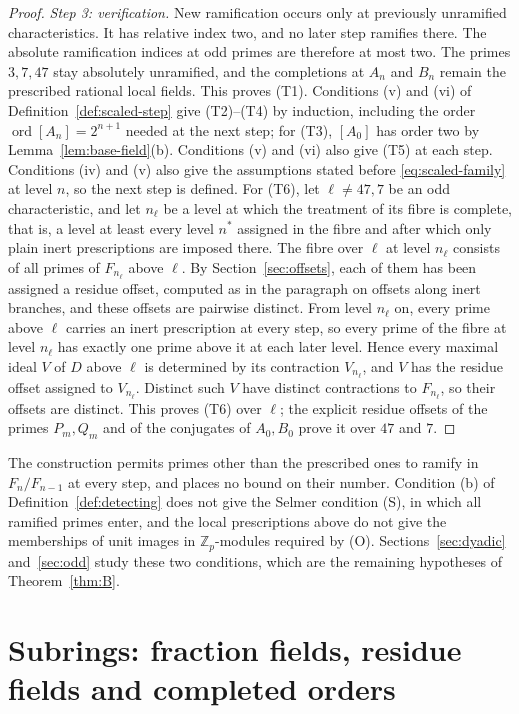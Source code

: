 \documentclass[11pt]{article}
\theoremstyle{plain}
\theoremstyle{definition}
\theoremstyle{remark}
\DeclareMathOperator{\ord}{ord}
\newcommand{\Z}{\mathbb Z}
\begin{document}
\begin{proof}
\emph{Step 3: verification.}  New ramification occurs only at previously
unramified characteristics.  It has relative index two, and no later step
ramifies there.  The absolute ramification indices at odd primes are
therefore at most two.  The primes $3,7,47$ stay absolutely unramified,
and the completions at $A_n$ and $B_n$ remain the prescribed rational
local fields.  This proves (T1).  Conditions (v) and (vi) of
Definition~\ref{def:scaled-step} give (T2)--(T4) by induction,
including the order $\ord[A_n]=2^{n+1}$ needed at the next step; for
(T3), $[A_0]$ has order two by Lemma~\ref{lem:base-field}(b).  Conditions (v)
and (vi) also give (T5) at each step.  Conditions (iv) and (v) also give the assumptions
stated before \eqref{eq:scaled-family} at level $n$, so the next step is
defined.  For (T6), let $\ell\ne47,7$ be an odd characteristic, and let
$n_\ell$ be a level at which the treatment of its fibre is complete,
that is, a level at least every level $n^*$ assigned in the fibre and
after which only plain inert prescriptions are imposed there.
The fibre over $\ell$ at level $n_\ell$ consists of all primes of
$F_{n_\ell}$ above $\ell$.  By Section~\ref{sec:offsets}, each of them has
been assigned a residue offset, computed as in the paragraph on offsets
along inert branches, and these offsets are pairwise distinct.  From level
$n_\ell$ on, every prime above $\ell$ carries an inert prescription at
every step, so every prime of the fibre at level $n_\ell$ has exactly one
prime above it at each later level.  Hence every maximal ideal $V$ of $D$
above $\ell$ is determined by its contraction $V_{n_\ell}$, and $V$ has
the residue offset assigned to $V_{n_\ell}$.  Distinct such $V$ have
distinct contractions to $F_{n_\ell}$, so their offsets are distinct.
This proves (T6) over $\ell$; the explicit residue offsets of the primes
$P_m,Q_m$ and of the conjugates of $A_0,B_0$ prove it over $47$ and $7$.
\end{proof}

The construction permits primes other than the prescribed ones to ramify
in $F_n/F_{n-1}$ at every step, and places no bound on their number.
Condition (b) of Definition~\ref{def:detecting} does not give the
Selmer condition (S), in which all ramified primes enter, and the local
prescriptions above do not give the memberships of unit images in
$\Z_p$-modules required by (O).  Sections~\ref{sec:dyadic} and~\ref{sec:odd} study these
two conditions, which are the remaining hypotheses of
Theorem~\ref{thm:B}.

\section{Subrings: fraction fields, residue fields and completed orders}\label{sec:orders}
\end{document}
